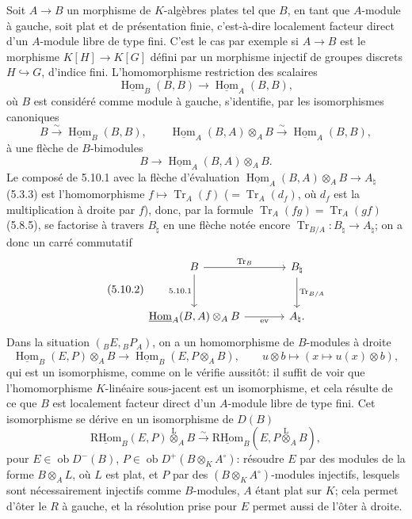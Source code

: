 \documentclass[11pt]{article}
\DeclareMathOperator{\Hom}{Hom}
\newcommand{\ob}{\operatorname{ob}}
\providecommand{\RHom}{\mathrm{RHom}}
\providecommand{\uRHom}{\underline{\RHom}}
\providecommand{\uHom}{\underline{\Hom}}
\providecommand{\Tr}{\operatorname{Tr}}
\providecommand{\Tr}{\operatorname{Tr}}
\providecommand{\lten}{\overset{\mathrm L}{\otimes}}
\providecommand{\Tr}{\operatorname{Tr}}
\providecommand{\RHom}{\mathrm{RHom}}
\providecommand{\Hom}{\operatorname{Hom}}
\providecommand{\ob}{\operatorname{ob}}
\providecommand{\lten}{\overset{\mathrm L}{\otimes}}
\providecommand{\RHom}{\mathrm R\mathcal{H}om}
\providecommand{\lten}{\overset{\mathrm L}{\otimes}}
\providecommand{\Tr}{\operatorname{Tr}}
\providecommand{\lten}{\overset{\mathrm L}{\otimes}}
\providecommand{\lten}{\overset{\mathrm L}{\otimes}}
\providecommand{\lten}{\overset{\mathrm L}{\otimes}}
\providecommand{\RHom}{\mathrm{RHom}}
\providecommand{\Hom}{\operatorname{Hom}}
\providecommand{\Tr}{\operatorname{Tr}}
\providecommand{\lten}{\overset{\mathrm L}{\otimes}}
\begin{document}
Soit $A\to B$ un morphisme de $K$-algèbres plates tel que $B$, en tant que $A$-module à gauche, soit plat et de présentation finie, c'est-à-dire localement facteur direct d'un $A$-module libre de type fini. C'est le cas par exemple si $A\to B$ est le morphisme $K[H]\to K[G]$ défini par un morphisme injectif de groupes discrets $H\hookrightarrow G$, d'indice fini. L'homomorphisme restriction des scalaires
\[
\uHom_B(B,B)\longrightarrow\uHom_A(B,B),
\]
où $B$ est considéré comme module à gauche, s'identifie, par les isomorphismes canoniques
\[
B\xrightarrow{\sim}\uHom_B(B,B),\qquad \uHom_A(B,A)\otimes_AB\xrightarrow{\sim}\uHom_A(B,B),
\]
à une flèche de $B$-bimodules
\begin{equation}\tag{5.10.1}
B\longrightarrow\uHom_A(B,A)\otimes_AB.
\end{equation}
Le composé de 5.10.1 avec la flèche d'évaluation $\uHom_A(B,A)\otimes_AB\to A_\natural$ (5.3.3) est l'homomorphisme $f\mapsto\Tr_A(f)$ ($=\Tr_A(d_f)$, où $d_f$ est la multiplication à droite par $f$), donc, par la formule $\Tr_A(fg)=\Tr_A(gf)$ (5.8.5), se factorise à travers $B_\natural$ en une flèche notée encore $\Tr_{B/A}:B_\natural\to A_\natural$; on a donc un carré commutatif
\begin{equation}\tag{5.10.2}
\begin{tikzcd}[column sep=large,row sep=large]
B \arrow[r,"\Tr_B"] \arrow[d,"5.10.1"'] & B_\natural \arrow[d,"\Tr_{B/A}"]\\
\uHom_A(B,A)\otimes_AB \arrow[r,"\mathrm{ev}"'] & A_\natural .
\end{tikzcd}
\end{equation}
Dans la situation $({}_BE,{}_BP_A)$, on a un homomorphisme de $B$-modules à droite
\begin{equation}\tag{5.10.3}
\uHom_B(E,P)\otimes_AB\longrightarrow\uHom_B(E,P\otimes_AB),\qquad
u\otimes b\longmapsto(x\longmapsto u(x)\otimes b),
\end{equation}
qui est un isomorphisme, comme on le vérifie aussitôt: il suffit de voir que l'homomorphisme $K$-linéaire sous-jacent est un isomorphisme, et cela résulte de ce que $B$ est localement facteur direct d'un $A$-module libre de type fini. Cet isomorphisme se dérive en un isomorphisme de $D(B)$
\begin{equation}\tag{5.10.4}
\uRHom_B(E,P)\lten_AB\xrightarrow{\sim}\uRHom_B(E,P\lten_AB),
\end{equation}
pour $E\in\ob D^-(B)$, $P\in\ob D^+(B\otimes_KA^\circ)$: résoudre $E$ par des modules de la forme $B\otimes_AL$, où $L$ est plat, et $P$ par des $(B\otimes_KA^\circ)$-modules injectifs, lesquels sont nécessairement injectifs comme $B$-modules, $A$ étant plat sur $K$; cela permet d'ôter le $R$ à gauche, et la résolution prise pour $E$ permet aussi de l'ôter à droite.
\end{document}
